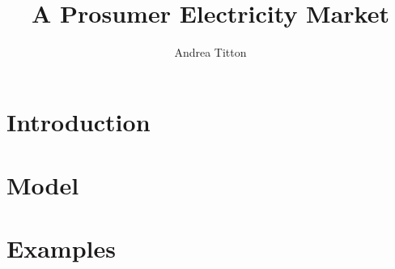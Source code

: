 \documentclass[american]{scrartcl}
\title{A Prosumer Electricity Market}
\author{Andrea Titton}
\begin{document}
\maketitle

\section{Introduction}



\section{Model}



\section{Examples}



\newpage
\nocite{*}
\printbibliography
\end{document}
